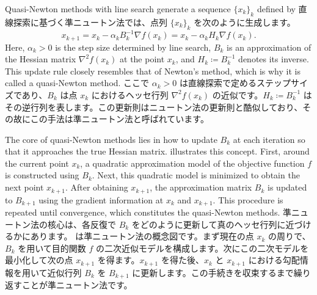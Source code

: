 \documentclass[0_main]{subfiles}
\begin{document}
\ifEn
    Quasi-Newton methods with line search generate a sequence $\{ x_k \}_k$ defined by
\else
    直線探索に基づく準ニュートン法では、点列 $\{ x_k \}_k$ を次のように生成します。
\fi
\begin{equation*}
    x_{k+1} = x_k - \alpha_k B_k^{-1} \nabla f(x_k)
    = x_k - \alpha_k H_k \nabla f(x_k).
\end{equation*}
\ifEn
    Here, $\alpha_k > 0$ is the step size determined by line search, $B_k$ is an approximation of the Hessian matrix $\nabla^2 f(x_k)$ at the point $x_k$, and $H_k \coloneqq B_k^{-1}$ denotes its inverse. This update rule closely resembles that of Newton's method, which is why it is called a quasi-Newton method.
\else
    ここで $\alpha_k > 0$ は直線探索で定めるステップサイズであり、$B_k$ は点 $x_k$ におけるヘッセ行列 $\nabla^2 f(x_k)$ の近似です。$H_k \coloneqq B_k^{-1}$ はその逆行列を表します。この更新則はニュートン法の更新則と酷似しており、その故にこの手法は準ニュートン法と呼ばれています。
\fi

\ifEn
    The core of quasi-Newton methods lies in how to update $B_k$ at each iteration so that it approaches the true Hessian matrix.
     illustrates this concept. First, around the current point $x_k$, a quadratic approximation model of the objective function $f$ is constructed using $B_k$. Next, this quadratic model is minimized to obtain the next point $x_{k+1}$. After obtaining $x_{k+1}$, the approximation matrix $B_k$ is updated to $B_{k+1}$ using the gradient information at $x_k$ and $x_{k+1}$. This procedure is repeated until convergence, which constitutes the quasi-Newton methods.
\else
    準ニュートン法の核心は、各反復で $B_k$ をどのように更新して真のヘッセ行列に近づけるかにあります。 は準ニュートン法の概念図です。まず現在の点 $x_k$ の周りで、$B_k$ を用いて目的関数 $f$ の二次近似モデルを構成します。次にこの二次モデルを最小化して次の点 $x_{k+1}$ を得ます。$x_{k+1}$ を得た後、$x_k$ と $x_{k+1}$ における勾配情報を用いて近似行列 $B_k$ を $B_{k+1}$ に更新します。この手続きを収束するまで繰り返すことが準ニュートン法です。
\fi
\end{document}
